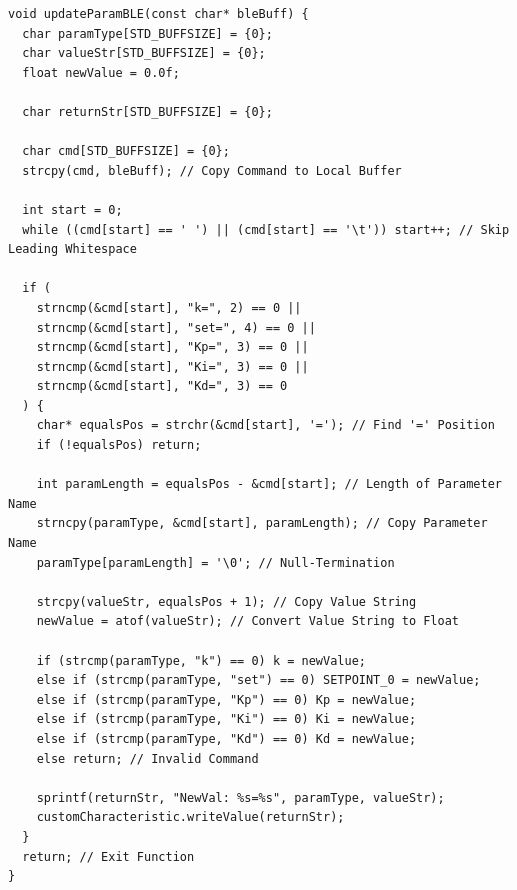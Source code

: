 \documentclass{article}
\begin{document}
\begin{lstlisting}[caption={Source Code : Arduino BLE Parameter Updates}, label={lst:arduino_ble_tuning_code}]
void updateParamBLE(const char* bleBuff) {
  char paramType[STD_BUFFSIZE] = {0};
  char valueStr[STD_BUFFSIZE] = {0};
  float newValue = 0.0f;

  char returnStr[STD_BUFFSIZE] = {0};

  char cmd[STD_BUFFSIZE] = {0};
  strcpy(cmd, bleBuff); // Copy Command to Local Buffer

  int start = 0;
  while ((cmd[start] == ' ') || (cmd[start] == '\t')) start++; // Skip Leading Whitespace

  if (
    strncmp(&cmd[start], "k=", 2) == 0 ||
    strncmp(&cmd[start], "set=", 4) == 0 ||
    strncmp(&cmd[start], "Kp=", 3) == 0 ||
    strncmp(&cmd[start], "Ki=", 3) == 0 ||
    strncmp(&cmd[start], "Kd=", 3) == 0
  ) {
    char* equalsPos = strchr(&cmd[start], '='); // Find '=' Position
    if (!equalsPos) return;

    int paramLength = equalsPos - &cmd[start]; // Length of Parameter Name
    strncpy(paramType, &cmd[start], paramLength); // Copy Parameter Name
    paramType[paramLength] = '\0'; // Null-Termination

    strcpy(valueStr, equalsPos + 1); // Copy Value String
    newValue = atof(valueStr); // Convert Value String to Float

    if (strcmp(paramType, "k") == 0) k = newValue;
    else if (strcmp(paramType, "set") == 0) SETPOINT_0 = newValue;
    else if (strcmp(paramType, "Kp") == 0) Kp = newValue;
    else if (strcmp(paramType, "Ki") == 0) Ki = newValue;
    else if (strcmp(paramType, "Kd") == 0) Kd = newValue;
    else return; // Invalid Command

    sprintf(returnStr, "NewVal: %s=%s", paramType, valueStr);
    customCharacteristic.writeValue(returnStr);
  }
  return; // Exit Function
}
\end{lstlisting}
\end{document}
